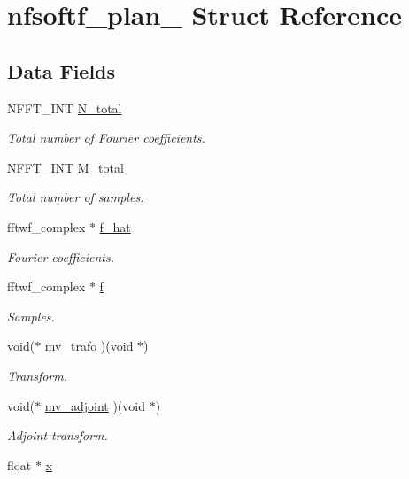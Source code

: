 \hypertarget{structnfsoftf__plan__}{\section{nfsoftf\-\_\-plan\-\_\- Struct Reference}
\label{structnfsoftf__plan__}
}
\subsection*{Data Fields}
\begin{DoxyCompactItemize}
\item 
N\-F\-F\-T\-\_\-\-I\-N\-T \hyperlink{structnfsoftf__plan___a1355e6064c2a0dd4357ed856dd0074a6}{N\-\_\-total}
\begin{DoxyCompactList}\small\item\em Total number of Fourier coefficients. \end{DoxyCompactList}\item 
N\-F\-F\-T\-\_\-\-I\-N\-T \hyperlink{structnfsoftf__plan___a1085539641dbe2980ff89c632a7994eb}{M\-\_\-total}
\begin{DoxyCompactList}\small\item\em Total number of samples. \end{DoxyCompactList}\item 
fftwf\-\_\-complex $\ast$ \hyperlink{structnfsoftf__plan___aa6990fedf1965a967f3f718dd373f543}{f\-\_\-hat}
\begin{DoxyCompactList}\small\item\em Fourier coefficients. \end{DoxyCompactList}\item 
fftwf\-\_\-complex $\ast$ \hyperlink{structnfsoftf__plan___a165dc6360c20f9eb19a55872cc29455a}{f}
\begin{DoxyCompactList}\small\item\em Samples. \end{DoxyCompactList}\item 
void($\ast$ \hyperlink{structnfsoftf__plan___a0291622a1f08aff56cc126ca64364d85}{mv\-\_\-trafo} )(void $\ast$)
\begin{DoxyCompactList}\small\item\em Transform. \end{DoxyCompactList}\item 
void($\ast$ \hyperlink{structnfsoftf__plan___a858269faf194eca2137b65f2a5a8c0fb}{mv\-\_\-adjoint} )(void $\ast$)
\begin{DoxyCompactList}\small\item\em Adjoint transform. \end{DoxyCompactList}\item 
\hypertarget{structnfsoftf__plan___a072fa8dcd38c95bec64c8e82af71afa7}{float $\ast$ \hyperlink{structnfsoftf__plan___a072fa8dcd38c95bec64c8e82af71afa7}{x}}\label{structnfsoftf__plan___a072fa8dcd38c95bec64c8e82af71afa7}


\end{DoxyCompactItemize}
